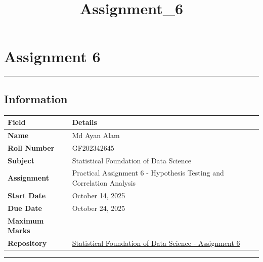 \documentclass[11pt]{article}
\title{Assignment\_6}
\begin{document}
    
    \maketitle
    
    

    
    \section{Assignment 6}\label{assignment-6}

\begin{center}\rule{0.5\linewidth}{0.5pt}\end{center}

\subsection{\texorpdfstring{\textbf{Information}}{Information}}\label{information}

\begin{longtable}[]{@{}
  >{\raggedright\arraybackslash}p{}
  >{\raggedright\arraybackslash}p{}@{}}
\toprule\noalign{}
\begin{minipage}[b]{\linewidth}\raggedright
Field
\end{minipage} & \begin{minipage}[b]{\linewidth}\raggedright
Details
\end{minipage} \\
\midrule\noalign{}
\endhead
\bottomrule\noalign{}
\endlastfoot
\textbf{Name} & Md Ayan Alam \\
\textbf{Roll Number} & GF202342645 \\
\textbf{Subject} & Statistical Foundation of Data Science \\
\textbf{Assignment} & Practical Assignment 6 - Hypothesis Testing and
Correlation Analysis \\
\textbf{Start Date} & October 14, 2025 \\
\textbf{Due Date} & October 24, 2025 \\
\textbf{Maximum Marks} & 20 \\
\textbf{Repository} &
\href{https://github.com/ayanalamMOON/Statistical-Foundation-of-Data-Science}{Statistical
Foundation of Data Science - Assignment 6} \\
\end{longtable}

\begin{center}\rule{0.5\linewidth}{0.5pt}\end{center}
\end{document}
